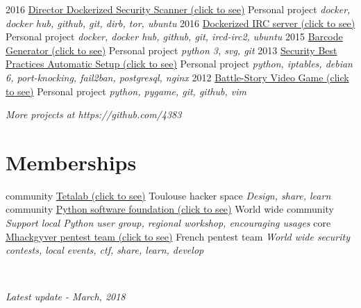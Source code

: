 \documentclass[]{friggeri-cv}
\begin{document}
\begin{entrylist}
    \entry
        {2016}
        {\href{https://hub.docker.com/r/4383/director}{Director Dockerized Security Scanner (click to see)}}
        {Personal project}
        {\emph{docker, docker hub, github, git, dirb, tor, ubuntu}}
    \entry
        {2016}
        {\href{https://hub.docker.com/r/4383/irc-server}{Dockerized IRC server (click to see)}}
        {Personal project}
        {\emph{docker, docker hub, github, git, ircd-irc2, ubuntu}}
    \entry
        {2015}
        {\href{http://pypi.python.org/pypi/barcode-generator/0.1rc15}{Barcode Generator (click to see)}}
        {Personal project}
        {\emph{python 3, svg, git}}
    \entry
        {2013}
        {\href{https://github.com/4383/fabric-debian/}{Security Best Practices Automatic Setup (click to see)}}
        {Personal project}
        {\emph{python, iptables,  debian 6, port-knocking, fail2ban, postgresql, nginx}}
    \entry
        {2012}
        {\href{http://github.com/4383/battle-story/}{Battle-Story Video Game (click to see)}}
        {Personal project}
        {\emph{python, pygame, git, github, vim}}
\end{entrylist}

\begin{flushright}
    \emph{More projects at https://github.com/4383}
\end{flushright}

\section{Memberships}
\begin{entrylist}
    \entry
        {community}
        {\href{https://www.tetalab.org/en}{Tetalab (click to see)}}
        {Toulouse hacker space}
        {\emph{Design, share, learn}}
    \entry
        {community}
        {\href{https://www.python.org/psf/}{Python software foundation (click to see)}}
        {World wide community}
        {\emph{Support local Python user group, regional workshop, encouraging usages}}
    \entry
        {core}
        {\href{https://github.com/mhackgyver-squad/mhackgyver}{Mhackgyver pentest team (click to see)}}
        {French pentest team}
        {\emph{World wide security contests, local events, ctf, share, learn, develop}}
\end{entrylist}

~
\begin{flushright}
    \emph{Latest update - March, 2018}
\end{flushright}
\end{document}
